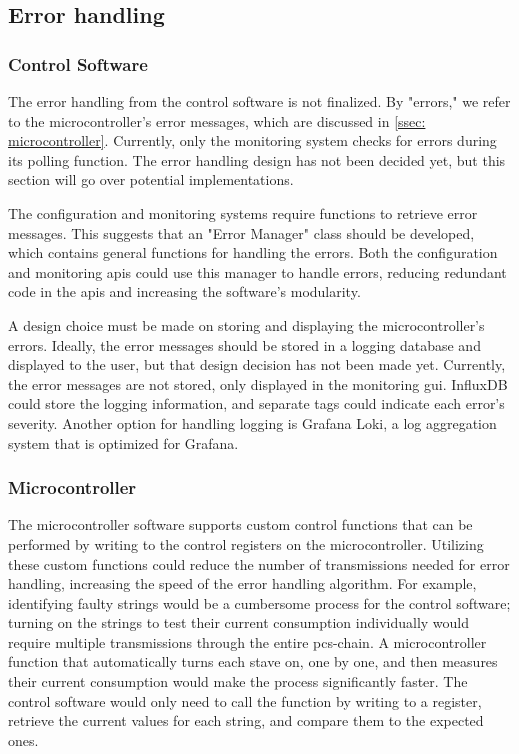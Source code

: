 \documentclass[main.tex]{subfiles}
\begin{document}
\subsection{Error handling}

\subsubsection{Control Software}

The error handling from the control software is not finalized. By "errors," we refer to the microcontroller's error messages, which are discussed in \autoref{ssec: microcontroller}. Currently, only the monitoring system checks for errors during its polling function. The error handling design has not been decided yet, but this section will go over potential implementations.

The configuration and monitoring systems require functions to retrieve error messages. This suggests that an "Error Manager" class should be developed, which contains general functions for handling the errors. Both the configuration and monitoring \gls{api}s could use this manager to handle errors, reducing redundant code in the \gls{api}s and increasing the software's modularity.

A design choice must be made on storing and displaying the microcontroller's errors. Ideally, the error messages should be stored in a logging database and displayed to the user, but that design decision has not been made yet. Currently, the error messages are not stored, only displayed in the monitoring \gls{gui}. InfluxDB could store the logging information, and separate tags could indicate each error's severity. Another option for handling logging is Grafana Loki, a log aggregation system that is optimized for Grafana. 

\subsubsection{Microcontroller}
The microcontroller software supports custom control functions that can be performed by writing to the control registers on the microcontroller. Utilizing these custom functions could reduce the number of transmissions needed for error handling, increasing the speed of the error handling algorithm. For example, identifying faulty strings would be a cumbersome process for the control software; turning on the strings to test their current consumption individually would require multiple transmissions through the entire \gls{pcs}-chain. A microcontroller function that automatically turns each stave on, one by one, and then measures their current consumption would make the process significantly faster. The control software would only need to call the function by writing to a register, retrieve the current values for each string, and compare them to the expected ones.
\end{document}
